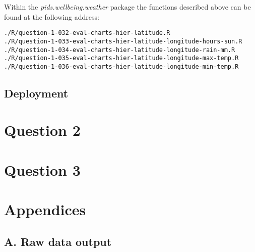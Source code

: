 \documentclass[12pt, oneside, openany]{book}
\begin{document}
Within the \emph{pids.wellbeing.weather} package the functions described above can be found at the following address:

\begin{verbatim}
./R/question-1-032-eval-charts-hier-latitude.R
./R/question-1-033-eval-charts-hier-latitude-longitude-hours-sun.R
./R/question-1-034-eval-charts-hier-latitude-longitude-rain-mm.R
./R/question-1-035-eval-charts-hier-latitude-longitude-max-temp.R
./R/question-1-036-eval-charts-hier-latitude-longitude-min-temp.R
\end{verbatim}

\section*{Deployment}

\setcounter{equation}{0}
\chapter*{Question 2}

\setcounter{equation}{0}
\chapter*{Question 3}

\pagebreak
 


\chapter*{Appendices}
\newpage

\section*{A. Raw data output}
\label{appendix:raw-data-output}

\backmatter
\end{document}
